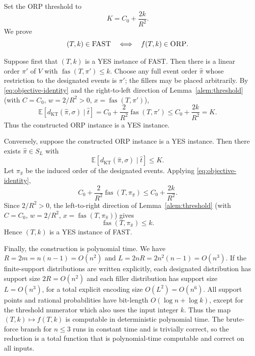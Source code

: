 \documentclass[11pt]{article}
\newcommand{\E}{\mathbb{E}}
\newcommand{\KT}{\operatorname{KT}}
\newcommand{\fas}{\operatorname{fas}}
\begin{document}
Set the ORP threshold to
\begin{equation}
  K=C_0+\frac{2k}{R^2}.
\end{equation}
We prove
\begin{equation}
  (T,k)\in\textsc{FAST}
  \quad\Longleftrightarrow\quad
  f(T,k)\in\textsc{ORP}.
\end{equation}

Suppose first that $(T,k)$ is a YES instance of FAST.  Then there is a linear order $\pi'$ of $V$ with $\fas(T,\pi')\le k$.  Choose any full event order $\hat\pi$ whose restriction to the designated events is $\pi'$; the fillers may be placed arbitrarily.  By \eqref{eq:objective-identity} and the right-to-left direction of Lemma~\ref{alem:threshold} (with $C=C_0$, $w=2/R^2>0$, $x=\fas(T,\pi')$),
\begin{equation}
  \E\left[d_{\KT}(\hat\pi,\sigma)\mid \hat t\right]
  =C_0+\frac2{R^2}\fas(T,\pi')
  \le C_0+\frac{2k}{R^2}=K.
\end{equation}
Thus the constructed ORP instance is a YES instance.

Conversely, suppose the constructed ORP instance is a YES instance.  Then there exists $\hat\pi\in S_L$ with
\begin{equation}
  \E\left[d_{\KT}(\hat\pi,\sigma)\mid \hat t\right]\le K.
\end{equation}
Let $\pi_{\hat\pi}$ be the induced order of the designated events.  Applying \eqref{eq:objective-identity},
\begin{equation}
  C_0+\frac2{R^2}\fas(T,\pi_{\hat\pi})
  \le C_0+\frac{2k}{R^2}.
\end{equation}
Since $2/R^2>0$, the left-to-right direction of Lemma~\ref{alem:threshold} (with $C=C_0$, $w=2/R^2$, $x=\fas(T,\pi_{\hat\pi})$) gives
\begin{equation}
  \fas(T,\pi_{\hat\pi})\le k.
\end{equation}
Hence $(T,k)$ is a YES instance of FAST.

Finally, the construction is polynomial time.  We have $R=2m=n(n-1)=O(n^2)$ and $L=2nR=2n^2(n-1)=O(n^3)$.  If the finite-support distributions are written explicitly, each designated distribution has support size $2R=O(n^2)$ and each filler distribution has support size $L=O(n^3)$, for a total explicit encoding size $O(L^2)=O(n^6)$.  All support points and rational probabilities have bit-length $O(\log n+\log k)$, except for the threshold numerator which also uses the input integer $k$.  Thus the map $(T,k)\mapsto f(T,k)$ is computable in deterministic polynomial time.  The brute-force branch for $n\le 3$ runs in constant time and is trivially correct, so the reduction is a total function that is polynomial-time computable and correct on all inputs.
\end{document}
